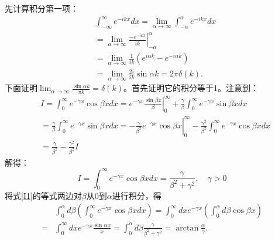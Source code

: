 先计算积分第一项：
\begin{equation}\label{}
    \begin{aligned}
        &  \int_{-\infty}^{\infty} e^{-i k x} d x=\lim _{\alpha \rightarrow \infty}  \int_{-\alpha}^{\alpha} e^{-i k x} d x \\
        &=\left.\lim _{\alpha \rightarrow \infty}  \frac{-e^{-i k x}}{i k}\right|_{-\alpha} ^{\alpha} \\
         &= \lim _{\alpha \rightarrow \infty} \frac{1}{ik} (e^{i \alpha k}-e^{-i \alpha k})\\
        &=\lim _{\alpha \rightarrow \infty} \frac{2i}{ik} \sin \alpha k=2\pi\delta(k) .
        \end{aligned}
\end{equation}
下面证明$\lim _{\alpha \rightarrow \infty} \frac{\sin \alpha k}{\pi k} =\delta(k)$。首先证明它的积分等于1。注意到：
\begin{equation}\label{}
    \begin{aligned}
        &I=\int_{0}^{\infty} e^{-\gamma x} \cos \beta x d x=\left.e^{-\gamma x} \frac{\sin \beta x}{\beta}\right|_{0} ^{\infty}+\frac{\gamma}{\beta} \int_{0}^{\infty} e^{-\gamma x} \sin \beta x d x\\
        &=\frac{\gamma}{\beta} \int_{0}^{\infty} e^{-\gamma x} \sin \beta x d x=-\left.\frac{\gamma}{\beta^{2}} e^{-\gamma x} \cos \beta x\right|_{0} ^{\infty}-\frac{\gamma^{2}}{\beta^{2}} \int_{0}^{\infty} e^{-\gamma x} \cos \beta x d x \\
        &=\frac{\gamma}{\beta^{2}}-\frac{\gamma^{2}}{\beta^{2}} I
    \end{aligned}
\end{equation}
解得：
\begin{equation}\label{I1}
    I=\int_0^{\infty} e^{-\gamma x} \cos \beta x d x=\frac{\gamma}{\beta^2+\gamma^2}, \quad \gamma>0
    \end{equation}
将式\ref{I1}的等式两边对$\beta$从0到$\alpha$进行积分，得
\begin{equation}\label{}
    \begin{aligned}
        & \int_0^\alpha d \beta\left(\int_0^{\infty} e^{-\gamma x} \cos \beta x d x\right)=\int_0^{\infty} d x e^{-\gamma x}\left(\int_0^\alpha d \beta \cos \beta x\right) \\
        = & \int_0^{\infty} d x e^{-\gamma x} \frac{\sin \alpha x}{x}=\int_0^\alpha d \beta \frac{\gamma}{\beta^2+\gamma^2}=\arctan \frac{\alpha}{\gamma} .
        \end{aligned}
\end{equation}
